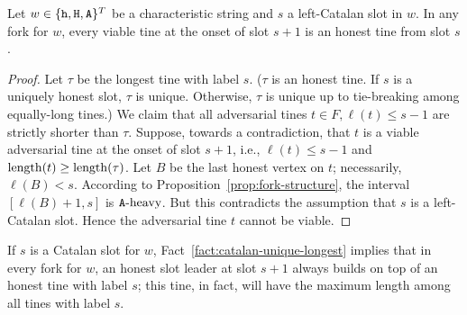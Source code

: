 \begin{fact}\label{fact:catalan-unique-longest}
  Let $w \in \{\mathtt{h}, \mathtt{H}, \mathtt{A}\}^T$ be a characteristic string 
  and $s$ a left-Catalan slot in $w$. 
  In any fork for $w$, 
  every viable tine at the onset of slot $s + 1$ is 
  an honest tine from slot $s$. 
\end{fact}
\begin{proof}
  Let $\tau$ be the longest tine with label $s$. 
  ($\tau$ is an honest tine. 
  If $s$ is a uniquely honest slot, 
  $\tau$ is unique. Otherwise, 
  $\tau$ is unique up to tie-breaking among equally-long tines.)
  We claim that 
  all adversarial tines $t \in F, \ell(t) \leq s - 1$ 
  are strictly shorter than $\tau$.
  Suppose, towards a contradiction, that 
  $t$ is a viable adversarial tine at the onset of slot $s + 1$, i.e., 
  $\ell(t) \leq s - 1$ and $\operatorname{length}(t) \geq \operatorname{length}(\tau)$. 
  Let $B$ be the last honest vertex on $t$; necessarily, $\ell(B) < s$. 
  According to 
  Proposition~\ref{prop:fork-structure},
  the interval $[\ell(B) + 1, s]$ is $\mathtt{A}\text{-heavy}$. 
  But this contradicts the assumption that $s$ is a left-Catalan slot. 
  Hence the adversarial tine $t$ cannot be viable.
\end{proof}


\begin{observation}\label{obs:multi-honest}
  If $s$ is a Catalan slot for $w$, Fact~\ref{fact:catalan-unique-longest} implies that 
  in every fork for $w$, 
  an honest slot leader at slot $s + 1$ always 
  builds on top of an honest tine with label $s$; 
  this tine, in fact, will have the maximum length among all tines with label $s$.
\end{observation}



